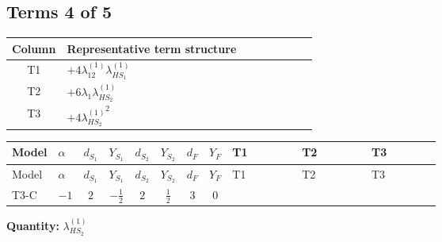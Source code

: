 \documentclass[8pt]{article}
\begin{document}
\begin{landscape}
\subsection*{Terms 4 of 5}
\begin{center}
\begin{tabular}{@{}c >{\raggedright\arraybackslash}p{0.82\linewidth}@{}}
\toprule
Column & Representative term structure \\
\midrule
T1 & \(\displaystyle +4 {\lambda_{12}^{(1)}} {\lambda_{HS_1}^{(1)}}\) \\
\midrule
T2 & \(\displaystyle +6 {\lambda_1} {\lambda_{HS_2}^{(1)}}\) \\
\midrule
T3 & \(\displaystyle +4 {\lambda_{HS_2}^{(1)}}^2\) \\
\midrule
\bottomrule
\end{tabular}
\end{center}
\smallskip
\tiny
\begin{longtable}{@{}llcccccc >{\raggedright\arraybackslash}p{0.21\linewidth} >{\raggedright\arraybackslash}p{0.21\linewidth} >{\raggedright\arraybackslash}p{0.21\linewidth}@{}}
\toprule
Model & $\alpha$ & $d_{S_1}$ & $Y_{S_1}$ & $d_{S_2}$ & $Y_{S_2}$ & $d_F$ & $Y_F$ & T1 & T2 & T3 \\
\midrule
\endfirsthead
\toprule
Model & $\alpha$ & $d_{S_1}$ & $Y_{S_1}$ & $d_{S_2}$ & $Y_{S_2}$ & $d_F$ & $Y_F$ & T1 & T2 & T3 \\
\midrule
\endhead
T3-C & $-1$ & $2$ & $-\frac{1}{2}$ & $2$ & $\frac{1}{2}$ & $3$ & $0$ & \scriptsize\adjustbox{max width=\linewidth}{$\begin{gathered} +4 {\lambda_{12}^{(1)}} {\lambda_{HS_1}^{(1)}}\end{gathered}$} & \scriptsize\adjustbox{max width=\linewidth}{$\begin{gathered} +6 {\lambda_1} {\lambda_{HS_2}^{(1)}}\end{gathered}$} & \scriptsize\adjustbox{max width=\linewidth}{$\begin{gathered} +4 {\lambda_{HS_2}^{(1)}}^2\end{gathered}$} \\
\midrule
\bottomrule
\end{longtable}
\clearpage
\noindent\textbf{Quantity: }$\lambda_{HS_2}^{(1)}$\par\smallskip

\end{landscape}
\end{document}
